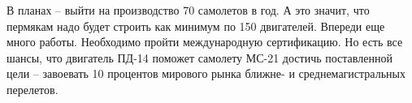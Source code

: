 В планах – выйти на производство 70 самолетов в год. А это значит, что пермякам
надо будет строить как минимум по 150 двигателей. Впереди еще много работы.
Необходимо пройти международную сертификацию. Но есть все шансы, что двигатель
ПД-14 поможет самолету МС-21 достичь поставленной цели – завоевать 10 процентов
мирового рынка ближне- и среднемагистральных перелетов.
